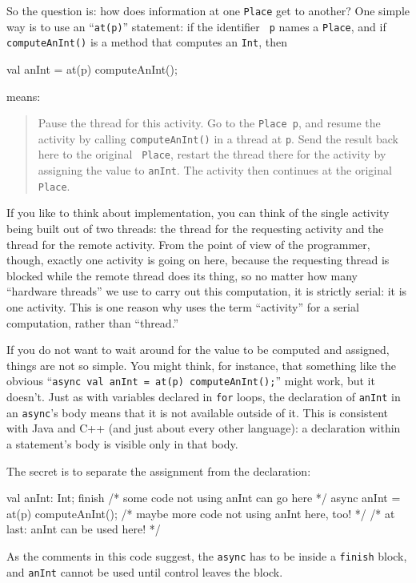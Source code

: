 So the question is: how does information at one {\tt Place} get to another? 
One simple way is to use an ``{\tt at(p)}''  statement: if the identifier {\tt
p} names a {\tt Place}, and if {\tt compute\-An\-Int()} is a method that
computes an {\tt Int}, then
\begin{xten}
val anInt = at(p) computeAnInt();
\end{xten} 
means: 
\begin{quote}
Pause the thread for this activity.  Go to the {\tt Place p}, and resume the activity
by calling {\tt compute\-An\-Int()} in a thread at {\tt p}. 
Send the result back here to the original {\tt
Place}, restart the thread there for the activity by assigning the value to {\tt anInt}.
The activity then continues at the original {\tt Place}.
\end{quote}
If you like to think about implementation, you can think of the single
\Xten{} activity being built out of two threads: the thread for the requesting
activity and the thread for the remote activity. From the point of view
of the \Xten{} programmer, though, exactly one activity is going on here,
because the requesting thread is blocked
while the remote thread does its thing, so no matter how many ``hardware
threads'' we use to carry out this computation, it is strictly serial:
it is one activity. This is one reason why \Xten{} uses the term
``activity'' for a serial computation, rather than ``thread.''

If you do not want to wait around for the value to be computed and assigned,
things are not so simple.  You might think, for instance,
that something like the obvious ``{\tt async val anInt =  at(p) computeAnInt();}''
might work, but it doesn't.   Just as with variables declared in {\tt for}  loops,
the declaration of {\tt anInt} 
in an {\tt async}'s body means that it is not available outside of it.  This
is consistent with Java and C++ (and just about every other language): a
declaration within a statement's body is visible only in that body.
 
The secret is to separate the assignment from the declaration:
\begin{xten}
val anInt: Int;
finish { 
   /* some code not using anInt can go here */
   async { anInt = at(p) computeAnInt(); }
   /* maybe more code not using anInt here, too! */
}
/* at last: anInt can be used here! */
\end{xten} 
As the comments in this code suggest, the {\tt async} has to be inside a
 {\tt finish} block, and  {\tt anInt} cannot be used until control leaves the block.
 
